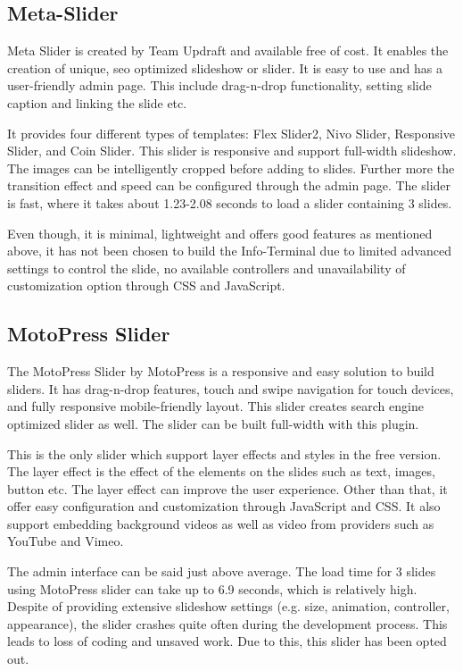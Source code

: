 \subsection{Meta-Slider}
Meta Slider is created by Team Updraft and available free of cost. It enables the creation of unique, \ac{seo} optimized slideshow or slider. It is easy to use and has a user-friendly admin page. This include drag-n-drop functionality, setting slide caption and linking the slide etc.

It provides four different types of templates: Flex Slider2, Nivo Slider, Responsive Slider, and Coin Slider. This slider is responsive and support full-width slideshow. The images can be intelligently cropped before adding to slides. Further more the transition effect and speed can be configured through the admin page. The slider is fast, where it takes about 1.23-2.08 seconds to load a slider containing 3 slides.

Even though, it is minimal, lightweight and offers good features as mentioned above, it has not been chosen to build the Info-Terminal due to limited advanced settings to control the slide, no available controllers and unavailability of customization option through CSS and JavaScript.

\subsection{MotoPress Slider}
The MotoPress Slider by MotoPress is a responsive and easy solution to build sliders. It has drag-n-drop features, touch and swipe navigation for touch devices, and fully responsive mobile-friendly layout. This slider creates search engine optimized slider as well. The slider can be built full-width with this plugin.

This is the only slider which support layer effects and styles in the free version. The layer effect is the effect of the elements on the slides such as text, images, button etc. The layer effect can improve the user experience. Other than that, it offer easy configuration and customization through JavaScript and CSS. It also support embedding background videos as well as video from providers such as YouTube and Vimeo.

The admin interface can be said just above average. The load time for 3 slides using MotoPress slider can take up to 6.9 seconds, which is relatively high. Despite of providing extensive slideshow settings (e.g. size, animation, controller, appearance), the slider crashes quite often during the development process. This leads to loss of coding and unsaved work. Due to this, this slider has been opted out.

